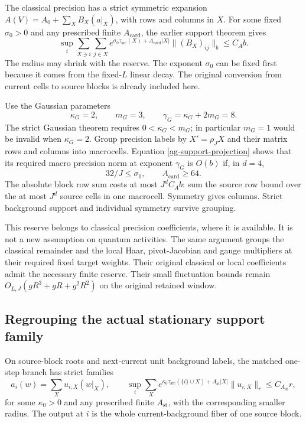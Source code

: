 The classical precision has a strict symmetric expansion
$A(V)=A_0+\sum_X B_X(a|_X)$, with rows and columns in $X$.
For some fixed $\sigma_0>0$ and any prescribed finite
$A_{\mathrm{card}}$, the earlier support theorem gives
\begin{equation}\label{ag-source-precision}
 \sup_i\sum_{X\ni i}\sum_{j\in X}
 e^{\sigma_0\tau_{\mathrm{src}}(X)+A_{\mathrm{card}}|X|}
            \|(B_X)_{ij}\|_b\le C_A b.
\end{equation}
The radius may shrink with the reserve. The exponent
$\sigma_0$ can be fixed first because it comes from the
fixed-$L$ linear decay. The original conversion from current
cells to source blocks is already included here.

Use the Gaussian parameters
\begin{equation}\label{ag-Gaussian-exponents}
 \kappa_G=2,\qquad m_G=3,\qquad
 \gamma_G=\kappa_G+2m_G=8.
\end{equation}
The strict Gaussian theorem requires $0<\kappa_G<m_G$;
in particular $m_G=1$ would be invalid when $\kappa_G=2$.
Group precision labels by $X'=\rho_JX$ and their matrix
rows and columns into macrocells. Equation
\eqref{ag-support-projection} shows that its required macro
precision norm at exponent $\gamma_G$ is $O(b)$ if, in $d=4$,
\begin{equation}\label{ag-precision-budget}
 32/J\le\sigma_0,\qquad A_{\mathrm{card}}\ge64.
\end{equation}
The absolute block row sum costs at most $J^d C_A b$:
sum the source row bound over the at most $J^d$ source cells
in one macrocell. Symmetry gives columns. Strict background
support and individual symmetry survive grouping.

This reserve belongs to classical precision coefficients,
where it is available. It is not a new assumption on quantum
activities. The same argument groups the classical remainder
and the local Haar, pivot-Jacobian and gauge multipliers at
their required fixed target weights. Their original classical
or local coefficients admit the necessary finite reserve.
Their small fluctuation bounds remain
$O_{L,J}(gR^3+gR+g^2R^2)$ on the original retained window.

\subsection{Regrouping the actual stationary support family}

On source-block roots and next-current unit background labels,
the matched one-step branch has strict families
\begin{equation}\label{ag-source-stationary}
 a_i(w)=\sum_Xu_{i;X}(w|_X),\qquad
 \sup_i\sum_Xe^{\kappa_0\tau_{\mathrm{src}}(\{i\}\cup X)
                       +A_{\mathrm{st}}|X|}
                  \|u_{i;X}\|_r\le C_{A_{\mathrm{st}}}r,
\end{equation}
for some $\kappa_0>0$ and any prescribed finite
$A_{\mathrm{st}}$, with the corresponding smaller radius.
The output at $i$ is the whole current-background fiber of
one source block.

